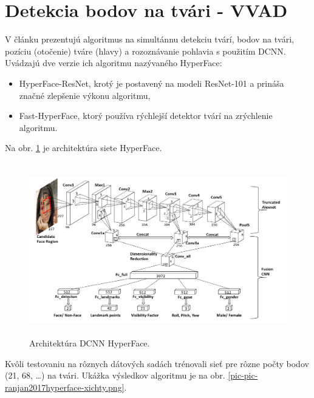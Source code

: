 \section{Detekcia bodov na tvári - VVAD}

V článku \cite{ranjan2017hyperface} prezentujú algoritmus na simultánnu detekciu tvárí, bodov na tvári, pozíciu (otočenie) tváre (hlavy) a rozoznávanie pohlavia s použitím DCNN. 
Uvádzajú dve verzie ich algoritmu nazývaného HyperFace:
 \begin{itemize}
\item HyperFace-ResNet, krotý je postavený na modeli ResNet-101 a prináša značné zlepšenie výkonu algoritmu,
\item Fast-HyperFace, ktorý používa rýchlejší detektor tvárí na zrýchlenie algoritmu.
\end{itemize}
Na obr. \ref{pic-ranjan2017hyperface-siet} je architektúra siete HyperFace. 

\begin{figure}[H]
	\begin{center}
		\includegraphics[height=7.5cm]{pics/pic-ranjan2017hyperface-siet.png}
		\caption{Architektúra DCNN HyperFace. 
		 \cite{ranjan2017hyperface}}
		\label{pic-ranjan2017hyperface-siet}
	\end{center}
\end{figure}

Kvôli testovaniu na rôznych dátových sadách trénovali sieť pre rôzne počty bodov (21, 68, \ldots) na tvári. 
Ukážka výsledkov algoritmu je na obr. \ref{pic-pic-ranjan2017hyperface-xichty.png}.

